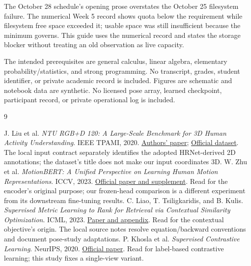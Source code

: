 The October 28 schedule's opening prose overstates the October 25 filesystem
failure. The numerical Week 5 record shows quota below the requirement while
filesystem free space exceeded it; usable space was still insufficient because
the minimum governs. This guide uses the numerical record and states the
storage blocker without treating an old observation as live capacity.

The intended prerequisites are general calculus, linear algebra, elementary
probability/statistics, and strong programming. No transcript, grades, student
identifier, or private academic record is included. Figures are schematic and
notebook data are synthetic. No licensed pose array, learned checkpoint,
participant record, or private operational log is included.

\begin{thebibliography}{9}
 J. Liu et al. \emph{NTU RGB+D 120: A Large-Scale Benchmark for
3D Human Activity Understanding}. IEEE TPAMI, 2020.
\href{https://arxiv.org/abs/1905.04757}{Authors' paper};
\href{https://rose1.ntu.edu.sg/dataset/actionRecognition/}{Official dataset}.
The local input contract separately identifies the adopted HRNet-derived 2D
annotations; the dataset's title does not make our input coordinates 3D.
 W. Zhu et al. \emph{MotionBERT: A Unified Perspective on
Learning Human Motion Representations}. ICCV, 2023.
\href{https://openaccess.thecvf.com/content/ICCV2023/html/Zhu_MotionBERT_A_Unified_Perspective_on_Learning_Human_Motion_Representations_ICCV_2023_paper.html}{Official paper and supplement}.
Read for the encoder's original purpose; our frozen-head comparison is a
different experiment from its downstream fine-tuning results.
 C. Liao, T. Tsiligkaridis, and B. Kulis.
\emph{Supervised Metric Learning to Rank for Retrieval via Contextual Similarity
Optimization}. ICML, 2023.
\href{https://proceedings.mlr.press/v202/liao23b.html}{Paper and appendix}.
Read for the contextual objective's origin. The local source notes resolve
equation/backward conventions and document pose-study adaptations.
 P. Khosla et al. \emph{Supervised Contrastive Learning}.
NeurIPS, 2020.
\href{https://papers.nips.cc/paper/2020/hash/d89a66c7c80a29b1bdbab0f2a1a94af8-Abstract.html}{Official paper}.
Read for label-based contrastive learning; this study fixes a single-view variant.
\end{thebibliography}
